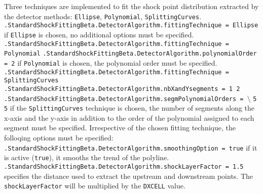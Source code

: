 \documentclass[11pt,a4paper,oneside]{article}
\begin{document}
Three techniques are implemented to fit the shock point distribution extracted by the detector methods: \texttt{Ellipse}, \texttt{Polynomial}, \texttt{SplittingCurves}.
\newline
\newline
\hspace*{1cm} \texttt{.StandardShockFittingBeta.DetectorAlgorithm.fittingTechnique = Ellipse}
\newline
\newline
if \texttt{Ellipse} is chosen, no additional options must be specified.
\newline
\newline
\hspace*{1cm} \texttt{.StandardShockFittingBeta.DetectorAlgorithm.fittingTechnique = Polynomial}
\newline
\texttt{.StandardShockFittingBeta.DetectorAlgorithm.polynomialOrder = 2}
\newline
\newline
if \texttt{Polynomial} is chosen, the polynomial order must be specified.
\newline
\newline
\hspace*{1cm} \texttt{.StandardShockFittingBeta.DetectorAlgorithm.fittingTechnique = SplittingCurves}
\newline
\hspace*{1cm} \texttt{.StandardShockFittingBeta.DetectorAlgorithm.nbXandYsegments = 1 2}
\newline
\hspace*{1cm} \texttt{.StandardShockFittingBeta.DetectorAlgorithm.segmPolynomialOrders = $\setminus$}
\newline
\hspace*{1.3cm} \texttt{5 5}
\newline
\newline
if the \texttt{SplittingCurves} technique is chosen, the number of segments along the x-axis and the y-axis in addition to the order of the polynomial assigned to each segment must be specified.
\newline
Irrespective of the chosen fitting technique, the folloqing options must be specified:
\newline
\newline
\hspace*{1cm} \texttt{.StandardShockFittingBeta.DetectorAlgorithm.smoothingOption = true}
\newline
\newline
if it is active (\texttt{true}), it smooths the trend of the polyline.
\newline
\newline
\hspace*{1cm} \texttt{.StandardShockFittingBeta.DetectorAlgorithm.shockLayerFactor = 1.5}
\newline
\newline
specifies the distance used to extract the upstream and downstream points. The \texttt{shockLayerFactor} will be multiplied by the \texttt{DXCELL} value.
\end{document}
